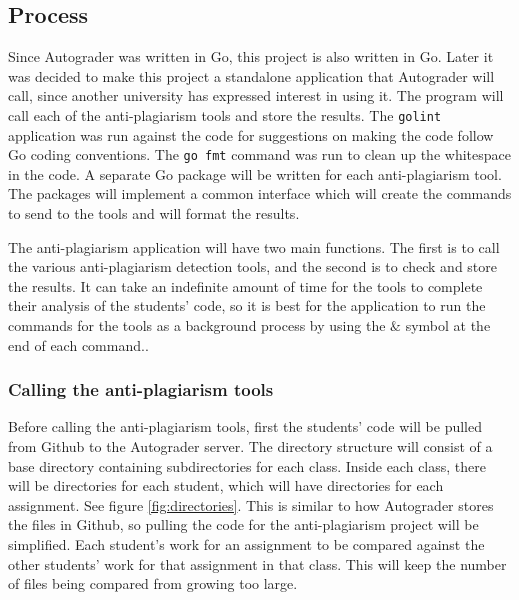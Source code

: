 \documentclass[12pt]{article}
\begin{document}
		\subsection{Process}
			Since Autograder was written in Go, this project is also written in Go. Later it was decided to make this project a standalone application that Autograder will call, since another university has expressed interest in using it. The program will call each of the anti-plagiarism tools and store the results. The \verb|golint| application was run against the code for suggestions on making the code follow Go coding conventions. The \verb|go fmt| command was run to clean up the whitespace in the code. A separate Go package will be written for each anti-plagiarism tool. The packages will implement a common interface which will create the commands to send to the tools and will format the results.
			
			The anti-plagiarism application will have two main functions. The first is to call the various anti-plagiarism detection tools, and the second is to check and store the results. It can take an indefinite amount of time for the tools to complete their analysis of the students' code, so it is best for the application to run the commands for the tools as a background process by using the $\&$ symbol at the end of each command..
			
			\subsubsection{Calling the anti-plagiarism tools}
			Before calling the anti-plagiarism tools, first the students' code will be pulled from Github to the Autograder server. The directory structure will consist of a base directory containing subdirectories for each class. Inside each class, there will be directories for each student, which will have directories for each assignment. See figure \ref{fig:directories}. This is similar to how Autograder stores the files in Github, so pulling the code for the anti-plagiarism project will be simplified. Each student's work for an assignment to be compared against the other students' work for that assignment in that class. This will keep the number of files being compared from growing too large. 
			
\end{document}

